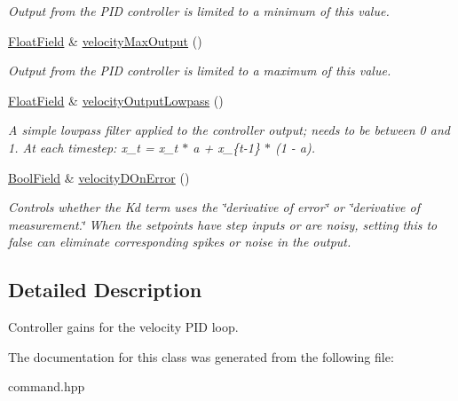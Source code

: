 \begin{DoxyCompactItemize}
\begin{DoxyCompactList}\small\item\em Output from the P\+ID controller is limited to a minimum of this value. \end{DoxyCompactList}\item 
\mbox{\label{classhebi_1_1Command_1_1Settings_1_1Actuator_1_1VelocityGains_a98c49a0a9f30665f3853ba5fb40ab0e3}} 
\hyperlink{classhebi_1_1Command_1_1FloatField}{Float\+Field} \& \hyperlink{classhebi_1_1Command_1_1Settings_1_1Actuator_1_1VelocityGains_a98c49a0a9f30665f3853ba5fb40ab0e3}{velocity\+Max\+Output} ()
\begin{DoxyCompactList}\small\item\em Output from the P\+ID controller is limited to a maximum of this value. \end{DoxyCompactList}\item 
\mbox{\label{classhebi_1_1Command_1_1Settings_1_1Actuator_1_1VelocityGains_af9258452e76fad7bbd0249b5f8567d02}} 
\hyperlink{classhebi_1_1Command_1_1FloatField}{Float\+Field} \& \hyperlink{classhebi_1_1Command_1_1Settings_1_1Actuator_1_1VelocityGains_af9258452e76fad7bbd0249b5f8567d02}{velocity\+Output\+Lowpass} ()
\begin{DoxyCompactList}\small\item\em A simple lowpass filter applied to the controller output; needs to be between 0 and 1. At each timestep\+: x\+\_\+t = x\+\_\+t $\ast$ a + x\+\_\+\{t-\/1\} $\ast$ (1 -\/ a). \end{DoxyCompactList}\item 
\mbox{\label{classhebi_1_1Command_1_1Settings_1_1Actuator_1_1VelocityGains_a986a2c7629468de54443dfb4a77a6fb2}} 
\hyperlink{classhebi_1_1Command_1_1BoolField}{Bool\+Field} \& \hyperlink{classhebi_1_1Command_1_1Settings_1_1Actuator_1_1VelocityGains_a986a2c7629468de54443dfb4a77a6fb2}{velocity\+D\+On\+Error} ()
\begin{DoxyCompactList}\small\item\em Controls whether the Kd term uses the \char`\"{}derivative of error\char`\"{} or \char`\"{}derivative of measurement.\char`\"{} When the setpoints have step inputs or are noisy, setting this to {\ttfamily false} can eliminate corresponding spikes or noise in the output. \end{DoxyCompactList}\end{DoxyCompactItemize}


\subsection{Detailed Description}
Controller gains for the velocity P\+ID loop. 

The documentation for this class was generated from the following file\+:\begin{DoxyCompactItemize}
\item 
command.\+hpp\end{DoxyCompactItemize}
